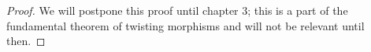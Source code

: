 \documentclass[../thesis.tex]{subfiles}
\begin{document}
            \begin{proof}
                We will postpone this proof until chapter 3; this is a part of the fundamental theorem of twisting morphisms and will not be relevant until then.
            \end{proof}


        




\end{document}
